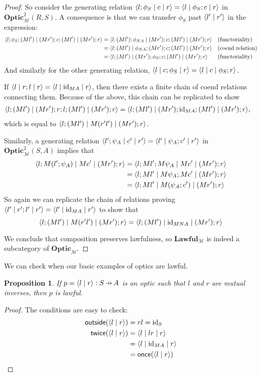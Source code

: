 \documentclass[11pt,letterpaper]{article}
\theoremstyle{plain}
\newtheorem{proposition}[theorem]{Proposition}
\theoremstyle{definition}
\newcommand{\M}{\mathscr{M}}
\newcommand{\Optic}{\mathbf{Optic}}
\newcommand{\Twoptic}{\mathbf{Optic}^2}
\newcommand{\Lawful}{\mathbf{Lawful}}
\newcommand{\id}{\mathrm{id}}
\newcommand{\rep}[2]{{\ensuremath \left\langle #1 \mid #2 \right\rangle}}
\newcommand{\repthree}[3]{{\ensuremath \langle #1 \mid #2 \mid #3 \rangle}}
\newcommand{\outside}{\mathsf{outside}}
\newcommand{\once}{\mathsf{once}}
\newcommand{\twice}{\mathsf{twice}}
\newcommand{\hto}{\ensuremath{\,\mathaccent\shortmid\rightarrow\,}}
\begin{document}
\begin{proof}
  So consider the generating relation $\repthree{l;\phi_S}{c}{r} = \repthree{l}{\phi_S ; c}{r}$ in $\Twoptic_\M(R, S)$. A consequence is that we can transfer $\phi_S$ past $\rep{l'}{r'}$ in the expression:
  \begin{align*}
    \repthree{l;\phi_S;(Ml')}{(Mr'); c ;(Ml')}{(Mr') ; r}
    &= \repthree{l;(Ml');\phi_{NA}}{(Mr'); c ;(Ml')}{(Mr') ; r} && \text{(functoriality)} \\
    &= \repthree{l;(Ml')}{\phi_{NA};(Mr'); c ;(Ml')}{(Mr') ; r} && \text{(coend relation)} \\
    &= \repthree{l;(Ml')}{(Mr');\phi_{S}; c ;(Ml')}{(Mr') ; r} && \text{(functoriality)}
  \end{align*}
  And similarly for the other generating relation, $\repthree{l}{c;\phi_S}{r} = \repthree{l}{c}{\phi_S; r}$.

  If $\repthree{l}{r;l}{r} = \repthree{l}{\id_{MA}}{r}$, then there exists a finite chain of coend relations connecting them. Because of the above, this chain can be replicated to show
  \begin{align*}
    \repthree{l;(Ml')}{(Mr');r;l;(Ml')}{(Mr') ; r} &= \repthree{l;(Ml')}{(Mr');\id_{MA};(Ml')}{(Mr') ; r},
  \end{align*}
  which is equal to $\repthree{l;(Ml')}{M(r'l')}{(Mr') ; r}$.

  Similarly, a generating relation $\repthree{l';\psi_A}{c'}{r'} = \repthree{l'}{\psi_A ; c'}{r'}$ in $\Twoptic_\M(S, A)$ implies that
  \begin{align*}
    \repthree{l;M(l';\psi_A)}{Mc'}{(Mr') ; r}
    &= \repthree{l;Ml';M\psi_A}{Mc'}{(Mr') ; r} \\
    &= \repthree{l;Ml'}{M\psi_A ; Mc'}{(Mr') ; r} \\
    &= \repthree{l;Ml'}{M(\psi_A;c')}{(Mr') ; r}
  \end{align*}
  So again we can replicate the chain of relations proving $\repthree{l'}{r';l'}{r'} = \repthree{l'}{\id_{MA}}{r'}$ to show that
  \[\repthree{l;(Ml')}{M(r'l')}{(Mr') ; r} = \repthree{l;(Ml')}{\id_{MNA}}{(Mr') ; r} \]

  We conclude that composition preserves lawfulness, so $\Lawful_\M$ is indeed a subcategory of $\Optic_\M$.
\end{proof}

We can check when our basic examples of optics are lawful.

\begin{proposition}
If $p = \rep{l}{r} : S \hto A$ is an optic such that $l$ and $r$ are mutual inverses, then $p$ is lawful.
\end{proposition}
\begin{proof}
The conditions are easy to check:
\begin{align*}
\outside(\rep{l}{r}) &= r l = \id_S \\
\twice(\rep{l}{r})
&= \repthree{l}{lr}{r} \\
&= \repthree{l}{\id_{MA}}{r} \\
&= \once(\rep{l}{r})
\end{align*}
\end{proof}
\end{document}
